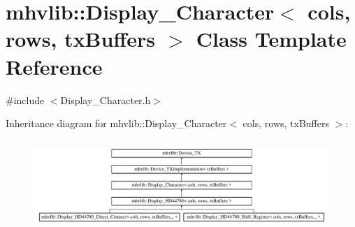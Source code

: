 \hypertarget{classmhvlib_1_1_display___character}{\section{mhvlib\-:\-:Display\-\_\-\-Character$<$ cols, rows, tx\-Buffers $>$ Class Template Reference}
\label{classmhvlib_1_1_display___character}
}


{\ttfamily \#include $<$Display\-\_\-\-Character.\-h$>$}

Inheritance diagram for mhvlib\-:\-:Display\-\_\-\-Character$<$ cols, rows, tx\-Buffers $>$\-:\begin{figure}[H]
\begin{center}
\leavevmode
\includegraphics[height=3.389831cm]{classmhvlib_1_1_display___character}
\end{center}
\end{figure}
